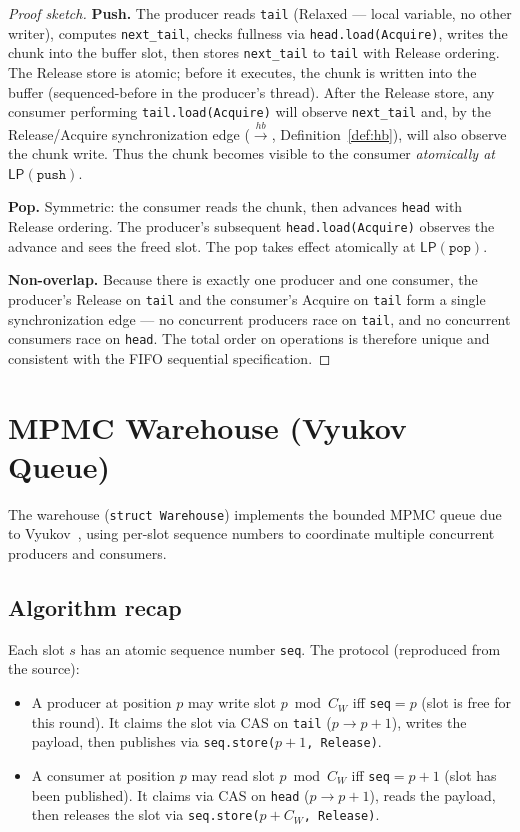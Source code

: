 \documentclass[11pt,a4paper]{report}
\newcommand{\LP}[1]{\mathsf{LP}(#1)}
\newcommand{\code}[1]{\texttt{#1}}
\begin{document}
\begin{proof}[Proof sketch]
\textbf{Push.}  The producer reads \code{tail} (Relaxed --- local
variable, no other writer), computes \code{next\_tail}, checks
fullness via \code{head.load(Acquire)}, writes the chunk into the
buffer slot, then stores \code{next\_tail} to \code{tail} with
Release ordering.  The Release store is atomic; before it executes,
the chunk is written into the buffer (sequenced-before in the
producer's thread).  After the Release store, any consumer
performing \code{tail.load(Acquire)} will observe \code{next\_tail}
and, by the Release/Acquire synchronization edge
($\xrightarrow{hb}$, Definition~\ref{def:hb}), will also observe
the chunk write.  Thus the chunk becomes visible to the consumer
\emph{atomically at} $\LP{\code{push}}$.

\textbf{Pop.}  Symmetric: the consumer reads the chunk, then
advances \code{head} with Release ordering.  The producer's
subsequent \code{head.load(Acquire)} observes the advance and sees
the freed slot.  The pop takes effect atomically at
$\LP{\code{pop}}$.

\textbf{Non-overlap.}  Because there is exactly one producer and
one consumer, the producer's Release on \code{tail} and the
consumer's Acquire on \code{tail} form a single synchronization
edge --- no concurrent producers race on \code{tail}, and no
concurrent consumers race on \code{head}.  The total order on
operations is therefore unique and consistent with the
FIFO sequential specification.
\end{proof}

\section{MPMC Warehouse (Vyukov Queue)}
\label{sec:mpmc}

The warehouse (\code{struct Warehouse}) implements the bounded MPMC
queue due to Vyukov~\cite{vyukov2010}, using per-slot sequence
numbers to coordinate multiple concurrent producers and consumers.

\subsection{Algorithm recap}

Each slot $s$ has an atomic sequence number \code{seq}.
The protocol (reproduced from the source):
\begin{itemize}
  \item A producer at position $p$ may write slot $p \bmod C_W$
        iff \code{seq}$= p$ (slot is free for this round).
        It claims the slot via CAS on \code{tail} ($p \to p+1$),
        writes the payload, then publishes via
        \code{seq.store($p+1$, Release)}.
  \item A consumer at position $p$ may read slot $p \bmod C_W$
        iff \code{seq}$= p+1$ (slot has been published).
        It claims via CAS on \code{head} ($p \to p+1$),
        reads the payload, then releases the slot via
        \code{seq.store($p + C_W$, Release)}.
\end{itemize}
\end{document}
